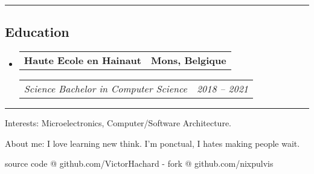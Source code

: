\documentclass[10pt,letterpaper]{article}
\makeatletter
\newenvironment{indentsection}[1]
{\begin{list}{}
  {\setlength{\leftmargin}{#1}} \item[]
}
{\end{list}}
\newcommand{\headerrow}[2]
{\begin{tabular*}{\linewidth}{l@{\extracolsep{\fill}}r}
  #1 &
  #2 \\
\end{tabular*}}
\makeatother
\begin{document}
\hrule
\vspace{-0.4em}
\subsection*{Education}
\begin{itemize}
  \parskip=0.1em

  \item
  \headerrow
    {\textbf{Haute Ecole en Hainaut}}
    {\textbf{Mons, Belgique}}
  \headerrow
    {\emph{Science Bachelor in Computer Science}}
    {\emph{2018 -- 2021}}
\end{itemize}




\hrule
\begin{indentsection}{\parindent}
\begin{description*}
\item[Interests:]
  Microelectronics, Computer/Software Architecture.
\item[About me:]
  I love learning new think. I’m ponctual, I hates making people wait.
\end{description*}
\end{indentsection}


\begin{center}
\footnotesize source code @ github.com/VictorHachard - fork @ github.com/nixpulvis
\end{center}
\end{document}
